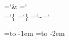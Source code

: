 \chardef\AM=`\& %
\chardef\BS=`\\ %
\chardef\LB=`\{ %
\def\LQ{{\tt\char'22}} %
\chardef\RB=`\} %
\def\RQ{{\tt\char'23}} %
\def\SP{{\tt\char`\ }} %
\chardef\TL=`\~ %
\chardef\UL=`\_ %

\newbox\bak \setbox\bak=\hbox to -1em{} %
\newbox\bakk\setbox\bakk=\hbox to -2em{} %

\newcount\ind %
\def\0{\ifmmode\ifinner$\par %
  \hangindent\ind em\noindent\kern\ind em\ignorespaces$\fi
  \else\par %
  \hangindent\ind em\noindent\kern\ind em\ignorespaces\fi}
\def\1{\global\advance\ind by1\hangindent\ind em} %
\def\2{\global\advance\ind by-1} %
\def\3#1{\hfil\penalty#10\hfilneg} %
\def\4{\copy\bak} %
\def\5{\hfil\penalty-1\hfilneg\kern2.5em\copy\bakk\ignorespaces}%
\def\6{\ifmmode\else\par %
  \hangindent\ind em\startline\ignorespaces\fi}
\def\7{\Y\6} %
\def\8{\unskip} %
\def\startline{\noindent
  \count255=\ind\advance\count255by-2
  \hskip\count255 em}

